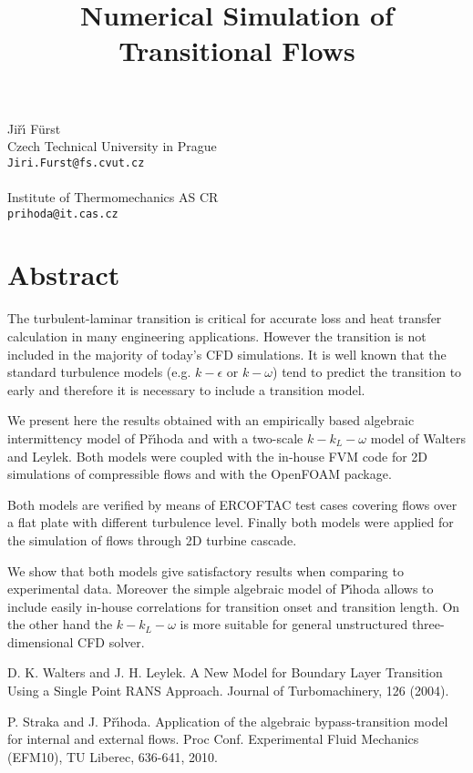 \title{Numerical Simulation of Transitional Flows}
 \author{} \institute{}
\maketitle
\begin{center}
{\large Ji\v{r}\'{\i} F\"urst}\\
Czech Technical University in Prague\\
{\tt Jiri.Furst@fs.cvut.cz}
\\ \\
Institute of Thermomechanics AS CR\\
{\tt prihoda@it.cas.cz}

\end{center}

\section*{Abstract}

The turbulent-laminar transition is critical for accurate loss and heat transfer calculation in many engineering applications. However the transition is not included in the majority of today's CFD simulations. It is well known that the standard turbulence models (e.g. $k-\epsilon$ or $k-\omega$) tend to predict the transition to early and therefore it is necessary to include a transition model.

We present here the results obtained with an empirically based algebraic intermittency model of P\v{r}\'{\i}hoda \cite{prihoda} and with a two-scale $k-k_L-\omega$ model of Walters and Leylek. Both models were coupled with the in-house FVM code for 2D simulations of compressible flows and with the OpenFOAM package.

Both models are verified by means of ERCOFTAC test cases covering flows over a flat plate with different turbulence level. Finally both models were applied for the simulation of flows through 2D turbine cascade.

We show that both models give satisfactory results when comparing to experimental data. Moreover the simple algebraic model of P\v{\i}hoda allows to include easily in-house correlations for transition onset and transition length. On the other hand the $k-k_L-\omega$ is more suitable for general unstructured three-dimensional CFD solver.



\begin{thebibliography}{10}

{\sc D. K. Walters and J. H. Leylek}. {A New Model for Boundary Layer Transition Using a Single Point RANS Approach}. Journal of Turbomachinery, 126 (2004).



{\sc P. Straka and J. P\v{r}\'{\i}hoda}. {Application of the algebraic bypass-transition model for internal and external flows}. Proc Conf. Experimental Fluid Mechanics (EFM10), TU Liberec, 636-641, 2010.

\end{thebibliography}
